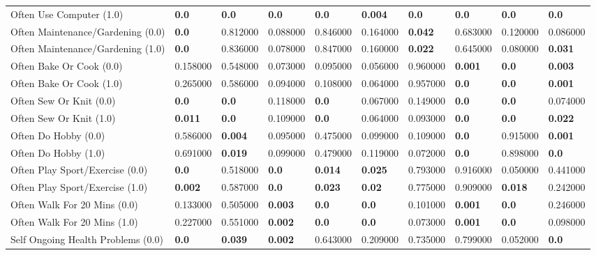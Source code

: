 \begin{tabular}{llllllllll}
Often Use Computer (1.0) & \textbf{0.0} & \textbf{0.0} & \textbf{0.0} & \textbf{0.0} & \textbf{0.004} & \textbf{0.0} & \textbf{0.0} & \textbf{0.0} & \textbf{0.0} \\
Often Maintenance/Gardening (0.0) & \textbf{0.0} & 0.812000 & 0.088000 & 0.846000 & 0.164000 & \textbf{0.042} & 0.683000 & 0.120000 & 0.086000 \\
Often Maintenance/Gardening (1.0) & \textbf{0.0} & 0.836000 & 0.078000 & 0.847000 & 0.160000 & \textbf{0.022} & 0.645000 & 0.080000 & \textbf{0.031} \\
Often Bake Or Cook (0.0) & 0.158000 & 0.548000 & 0.073000 & 0.095000 & 0.056000 & 0.960000 & \textbf{0.001} & \textbf{0.0} & \textbf{0.003} \\
Often Bake Or Cook (1.0) & 0.265000 & 0.586000 & 0.094000 & 0.108000 & 0.064000 & 0.957000 & \textbf{0.0} & \textbf{0.0} & \textbf{0.001} \\
Often Sew Or Knit (0.0) & \textbf{0.0} & \textbf{0.0} & 0.118000 & \textbf{0.0} & 0.067000 & 0.149000 & \textbf{0.0} & \textbf{0.0} & 0.074000 \\
Often Sew Or Knit (1.0) & \textbf{0.011} & \textbf{0.0} & 0.109000 & \textbf{0.0} & 0.064000 & 0.093000 & \textbf{0.0} & \textbf{0.0} & \textbf{0.022} \\
Often Do Hobby (0.0) & 0.586000 & \textbf{0.004} & 0.095000 & 0.475000 & 0.099000 & 0.109000 & \textbf{0.0} & 0.915000 & \textbf{0.001} \\
Often Do Hobby (1.0) & 0.691000 & \textbf{0.019} & 0.099000 & 0.479000 & 0.119000 & 0.072000 & \textbf{0.0} & 0.898000 & \textbf{0.0} \\
Often Play Sport/Exercise (0.0) & \textbf{0.0} & 0.518000 & \textbf{0.0} & \textbf{0.014} & \textbf{0.025} & 0.793000 & 0.916000 & 0.050000 & 0.441000 \\
Often Play Sport/Exercise (1.0) & \textbf{0.002} & 0.587000 & \textbf{0.0} & \textbf{0.023} & \textbf{0.02} & 0.775000 & 0.909000 & \textbf{0.018} & 0.242000 \\
Often Walk For 20 Mins (0.0) & 0.133000 & 0.505000 & \textbf{0.003} & \textbf{0.0} & \textbf{0.0} & 0.101000 & \textbf{0.001} & \textbf{0.0} & 0.246000 \\
Often Walk For 20 Mins (1.0) & 0.227000 & 0.551000 & \textbf{0.002} & \textbf{0.0} & \textbf{0.0} & 0.073000 & \textbf{0.001} & \textbf{0.0} & 0.098000 \\
Self Ongoing Health Problems (0.0) & \textbf{0.0} & \textbf{0.039} & \textbf{0.002} & 0.643000 & 0.209000 & 0.735000 & 0.799000 & 0.052000 & \textbf{0.0} \\

\end{tabular}
